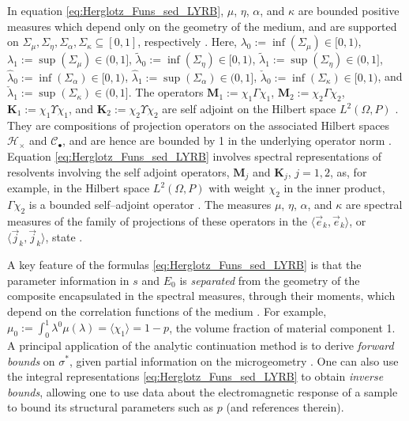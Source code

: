 \documentclass[english,12pt,jmp,graphicx]{revtex4-1}
\begin{document}
In equation
\eqref{eq:Herglotz_Funs_sed_LYRB}, $\mu$, $\eta$, $\alpha$, and $\kappa$
are bounded positive measures which depend only on the geometry of the
medium, and are supported on $\Sigma_\mu,\Sigma_\eta,\Sigma_\alpha,\Sigma_\kappa\subseteq[0,1]$, respectively
\cite{Golden:CMP-473,Bergman:AP-78}. Here, $\lambda_0:=\inf(\Sigma_\mu)\in[0,1)$, 
$\lambda_1:=\sup(\Sigma_\mu)\in(0,1]$, $\tilde{\lambda}_0:=\inf(\Sigma_\eta)\in[0,1)$,
$\tilde{\lambda}_1:=\sup(\Sigma_\eta)\in(0,1]$, $\hat{\lambda}_0:=\inf(\Sigma_\alpha)\in[0,1)$,
$\hat{\lambda}_1:=\sup(\Sigma_\alpha)\in(0,1]$, $\check{\lambda}_0:=\inf(\Sigma_\kappa)\in[0,1)$, and
$\check{\lambda}_1:=\sup(\Sigma_\kappa)\in(0,1]$. The operators
$\mathbf{M}_1:=\chi_1\Gamma\chi_1$, $\mathbf{M}_2:=\chi_2\Gamma\chi_2$,
$\mathbf{K}_1:=\chi_1\Upsilon\chi_1$, and $\mathbf{K}_2:=\chi_2\Upsilon\chi_2$ are self adjoint
on the Hilbert space $L^2(\Omega,P)$ \cite{Golden:CMP-473}. They are
compositions of projection operators on the associated Hilbert spaces
$\mathscr{H}_\times$ and $\mathscr{C}_\bullet$, and are hence are bounded by 1 in
the underlying operator norm
\cite{Folland:95,Golden:CMP-473}. Equation
\eqref{eq:Herglotz_Funs_sed_LYRB} involves spectral representations of
resolvents involving the self adjoint operators, $\mathbf{M}_j$ and
$\mathbf{K}_j$, $j=1,2$, as, for example, in the Hilbert space
$L^2(\Omega,P)$ with weight $\chi_2$ in the inner product, $\Gamma\chi_2$ is a 
bounded self--adjoint operator \cite{Golden:CMP-473}. The measures $\mu$,
$\eta$, $\alpha$, and $\kappa$ are spectral measures of the family of projections
of these operators in the $\langle\vec{e}_k,\vec{e}_k\rangle$, or
$\langle\vec{j}_k,\vec{j}_k\rangle$, state \cite{Golden:CMP-473,Reed-1980}.

A key feature of the formulas \eqref{eq:Herglotz_Funs_sed_LYRB} is
that the parameter information in $s$ and $E_0$ is {\it separated}
from the geometry of the composite encapsulated in the spectral
measures, through their moments, which depend on the correlation 
functions of the medium \cite{Golden:CMP-473}. For example, 
$\mu_0:=\int_0^1\lambda^0\mu(\lambda)=\langle\chi_1\rangle=1-p$, the volume fraction of material
component 1. A principal application of the analytic continuation
method is to derive \emph{forward bounds} on $\sigma^*$, given partial
information on the microgeometry
\cite{Bergman:PRL-1285,Milton:APL-300,Golden:CMP-473,Bergman:AP-78}. One  
can also use the integral representations
\eqref{eq:Herglotz_Funs_sed_LYRB} to obtain \emph{inverse bounds},
allowing one to use data about the electromagnetic response of a
sample to bound its structural parameters such as $p$
\cite{Golden:JoB:337} (and references therein).
         
\end{document}
